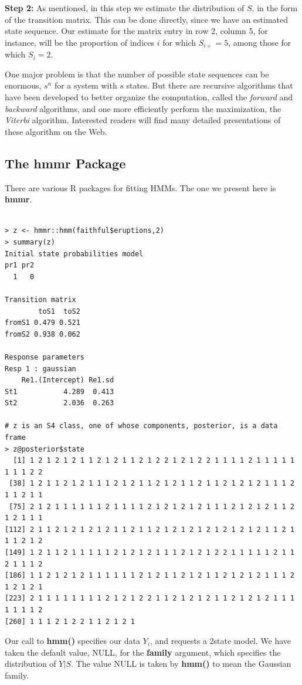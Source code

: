 \documentclass[11pt]{article}
\begin{document}
\textbf{Step 2:} As mentioned, in this step we estimate the distribution
of $S$, in the form of the transition matrix.  This can be done
directly, since we have an estimated state sequence.  Our estimate for
the matrix entry in row 2, column 5, for instance, will be the
proportion of indices $i$ for which $S_{i+} = 5$, among those for which
$S_i = 2$.

One major problem is that the number of possible state sequences can be
enormous, $s^n$ for a system with $s$ states.  But there are recursive
algorithms that have been developed to better organize the computation,
called the \textit{forward} and \textit{backward} algorithms, and one
more efficiently perform the maximization, the \textit{Viterbi}
algorithm.  Interested readers will find many detailed presentations of
these algorithm on the Web.

\subsection{The hmmr Package}

There are various R packages for fitting HMMs.  The one we present here
is \textbf{hmmr}.

\begin{lstlisting}

> z <- hmmr::hmm(faithful$eruptions,2)
> summary(z)
Initial state probabilities model 
pr1 pr2 
  1   0 

Transition matrix 
        toS1  toS2
fromS1 0.479 0.521
fromS2 0.938 0.062

Response parameters 
Resp 1 : gaussian 
    Re1.(Intercept) Re1.sd
St1           4.289  0.413
St2           2.036  0.263

# z is an S4 class, one of whose components, posterior, is a data frame
> z@posterior$state
  [1] 1 2 1 2 1 2 1 1 2 1 2 1 1 2 1 2 2 1 2 1 2 2 1 1 1 1 2 1 1 1 1 1 1 1 1 2 2
 [38] 1 2 1 1 2 1 2 1 1 1 2 1 2 1 1 2 1 2 1 1 2 1 1 2 1 2 1 2 1 1 1 2 1 1 2 1 1
 [75] 2 1 2 1 1 1 1 1 1 2 1 1 1 1 2 1 2 1 2 1 2 1 1 1 2 1 2 1 2 1 1 2 1 2 1 1 1
[112] 2 1 1 2 1 2 1 2 1 2 1 1 2 1 1 2 1 2 1 2 1 2 1 2 1 2 1 2 1 1 2 1 1 1 2 1 2
[149] 1 2 1 1 2 1 1 1 1 1 2 1 2 1 2 1 1 1 2 1 2 1 2 2 1 1 1 1 1 2 1 1 2 1 1 1 2
[186] 1 1 2 1 2 1 2 1 1 1 1 1 1 2 1 2 1 1 2 1 2 1 1 2 1 2 1 2 1 1 1 2 1 2 1 2 1
[223] 2 1 1 1 1 1 1 1 1 2 1 2 1 2 2 1 1 2 1 2 1 2 1 1 2 1 2 1 2 1 1 1 1 1 1 1 2
[260] 1 1 1 2 1 2 2 1 1 2 1 2 1

\end{lstlisting}

Our call to \textbf{hmm()} specifies our data $Y_i$, and requests a 2state
model.  We have taken the default value, NULL, for the \textbf{family}
argument, which specifies the distribution of $Y | S$.  The value NULL
is taken by \textbf{hmm()} to mean the Gaussian family.
\end{document}
